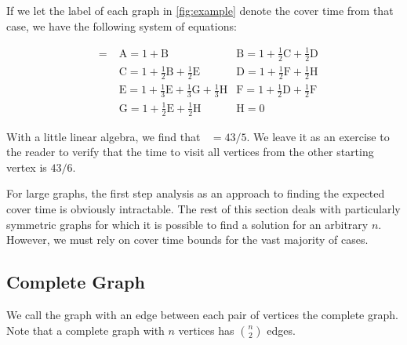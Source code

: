 \documentclass[12pt]{article}
\theoremstyle{definition}
\DeclareMathOperator{\tcov}{t_\textrm{cov}}      %
\begin{document}
If we let the label of each graph in \cref{fig:example}
denote the cover time from that case, we have the following system
of equations:

\begin{align}
\tcov = &\textrm{A} = 1 + \textrm{B}
&\textrm{B} = 1 + \frac{1}{2}\textrm{C} + \frac{1}{2}\textrm{D} \nonumber \\
&\textrm{C} = 1 + \frac{1}{2}\textrm{B} + \frac{1}{2}\textrm{E}
&\textrm{D} = 1 + \frac{1}{2}\textrm{F} + \frac{1}{2}\textrm{H} \nonumber \\
&\textrm{E} = 1 + \frac{1}{3}\textrm{E} + \frac{1}{3}\textrm{G} + \frac{1}{3}\textrm{H}
&\textrm{F} = 1 + \frac{1}{2}\textrm{D} + \frac{1}{2}\textrm{F} \nonumber \\
&\textrm{G} = 1 + \frac{1}{2}\textrm{E} + \frac{1}{2}\textrm{H}
&\textrm{H} = 0\nonumber
\end{align}

With a little linear algebra, we find that $\tcov = 43/5$.
We leave it as an exercise to the reader to verify that the time
to visit all vertices from the other starting vertex is $43/6$.

For large graphs, the first step analysis as an approach to finding the expected
cover time is obviously intractable.
The rest of this section deals with particularly symmetric graphs
for which it is possible to find a solution for an arbitrary $n$.
However, we must rely on cover time bounds for the vast majority of cases.

\subsection{Complete Graph}\label{sec:complete}
We call the graph with an edge between each pair of vertices the
complete graph.
Note that a complete graph with $n$ vertices has ${n \choose 2}$ edges.
\end{document}
